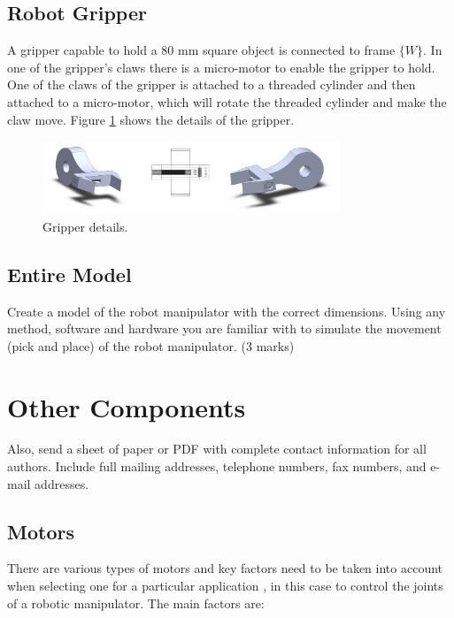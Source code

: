 \documentclass[transmag]{IEEEtran}
\begin{document}
\subsection{Robot Gripper}
A gripper capable to hold a 80 mm square object is connected to frame $\{W\}$.
In one of the gripper's claws there is a micro-motor to enable the gripper to hold.
One of the claws of the gripper is attached to a threaded cylinder and then attached to a micro-motor, which will rotate the threaded cylinder and make the claw move. Figure \ref{Gripper} shows the details of the gripper.

\begin{figure}
\centerline{\includegraphics[width=3.5in]{./images/Gripper}}
\caption{Gripper details.\label{Gripper}}
\end{figure}
 

\subsection{Entire Model}
Create a model of the robot manipulator with the correct dimensions. Using any method, software and hardware you are familiar with to simulate the movement (pick and place) of the robot manipulator. (3 marks)



















\section{Other Components}
Also, send a sheet of paper or PDF with complete contact information for all 
authors. Include full mailing addresses, telephone numbers, fax numbers, and 
e-mail addresses.


\subsection{Motors}

There are various types of motors and key factors need to be taken into account when selecting one for a particular application \cite{ref3}, in this case to control the joints of a robotic manipulator. The main factors are:
\end{document}
